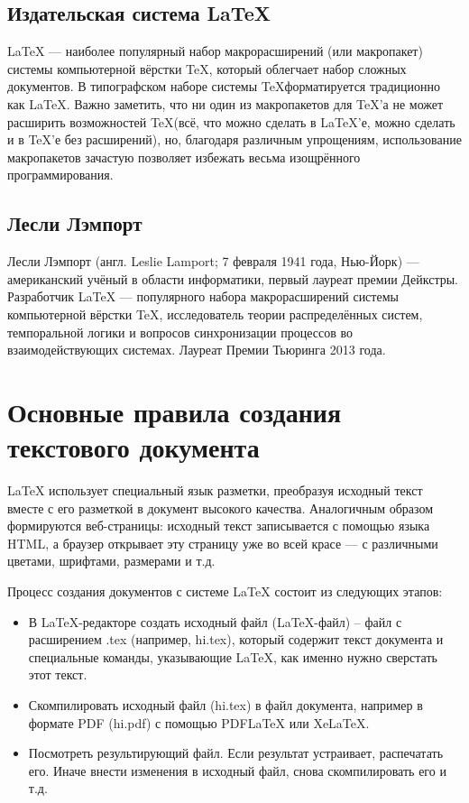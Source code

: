 \documentclass[a4paper,12pt]{article} %
\begin{document}
\subsection{Издательская система LaTeX}
\LaTeX{} — наиболее популярный набор макрорасширений (или макропакет) системы компьютерной вёрстки \TeX, который облегчает набор сложных документов. В типографском наборе системы \TeX форматируется традиционно как \LaTeX{}.
Важно заметить, что ни один из макропакетов для \TeX’а не может расширить возможностей \TeX (всё, что можно сделать в \LaTeX{}’е, можно сделать и в \TeX’е без расширений), но, благодаря различным упрощениям, использование макропакетов зачастую позволяет избежать весьма изощрённого программирования.


\subsection{Лесли Лэмпорт}
Лесли Лэмпорт (англ. Leslie Lamport; 7 февраля 1941 года, Нью-Йорк) — американский учёный в области информатики, первый лауреат премии Дейкстры. Разработчик \LaTeX{} — популярного набора макрорасширений системы компьютерной вёрстки \TeX, исследователь теории распределённых систем, темпоральной логики и вопросов синхронизации процессов во взаимодействующих системах. Лауреат Премии Тьюринга 2013 года.


\section{Основные правила создания текстового документа}
\LaTeX{} использует специальный язык разметки, преобразуя исходный текст вместе с его разметкой в документ высокого качества. Аналогичным образом формируются веб-страницы: исходный текст записывается с помощью языка HTML, а браузер открывает эту страницу уже во всей красе — с различными цветами, шрифтами, размерами и т.д.

Процесс создания документов с системе LaTeX состоит из следующих этапов:
\begin{itemize}
\item В LaTeX-редакторе создать исходный файл (LaTeX-файл) – файл с расширением .tex (например, hi.tex), который содержит текст документа и специальные команды, указывающие LaTeX, как именно нужно сверстать этот текст.
\item Скомпилировать исходный файл (hi.tex) в файл документа, например в формате PDF (hi.pdf) с помощью PDFLaTeX или XeLaTeX.
\item Посмотреть результирующий файл. Если результат устраивает, распечатать его. Иначе внести изменения в исходный файл, снова скомпилировать его и т.д.


\end{itemize}
\end{document}
